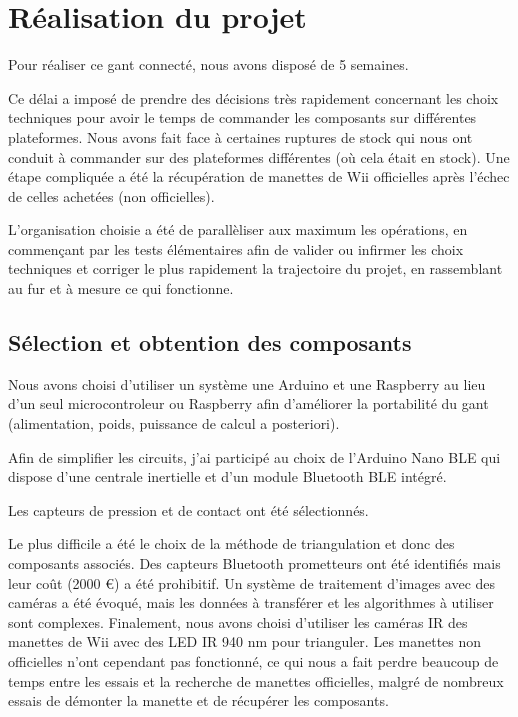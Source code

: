 \documentclass{article}
\begin{document}
    \section{Réalisation du projet}

            Pour réaliser ce gant connecté, nous avons disposé de 5 semaines.

            Ce délai a imposé de prendre des décisions très rapidement concernant les choix techniques
                pour avoir le temps de commander les composants sur différentes plateformes.
            Nous avons fait face à certaines ruptures de stock qui nous ont conduit à commander sur 
                des plateformes différentes (où cela était en stock).
            Une étape compliquée a été la récupération de manettes de Wii officielles après l'échec
                de celles achetées (non officielles).

            L'organisation choisie a été de parallèliser aux maximum les opérations, en commençant par les tests élémentaires
                afin de valider ou infirmer les choix techniques et corriger le plus rapidement la trajectoire du projet,
                en rassemblant au fur et à mesure ce qui fonctionne.

        \subsection{Sélection et obtention des composants}
        
            Nous avons choisi d'utiliser un système une Arduino et une Raspberry
                au lieu d'un seul microcontroleur ou Raspberry afin d'améliorer la portabilité du gant
                (alimentation, poids, puissance de calcul a posteriori).           
            

            Afin de simplifier les circuits, j'ai participé au choix de l'Arduino Nano BLE
                qui dispose d'une centrale inertielle et d'un module Bluetooth BLE intégré.

            Les capteurs de pression et de contact ont été sélectionnés.

            Le plus difficile a été le choix de la méthode de triangulation et donc des composants associés.
                Des capteurs Bluetooth prometteurs ont été identifiés mais leur coût (2000 €) a été prohibitif.
                Un système de traitement d'images avec des caméras a été évoqué, mais les données à transférer
                et les algorithmes à utiliser sont complexes.
                Finalement, nous avons choisi d'utiliser les caméras IR des manettes de Wii avec des LED IR 940 nm
            pour trianguler. Les manettes non officielles n'ont cependant pas fonctionné, ce qui nous a fait
            perdre beaucoup de temps entre les essais et la recherche de manettes officielles, malgré de nombreux essais
                de démonter la manette et de récupérer les composants.        
\end{document}
